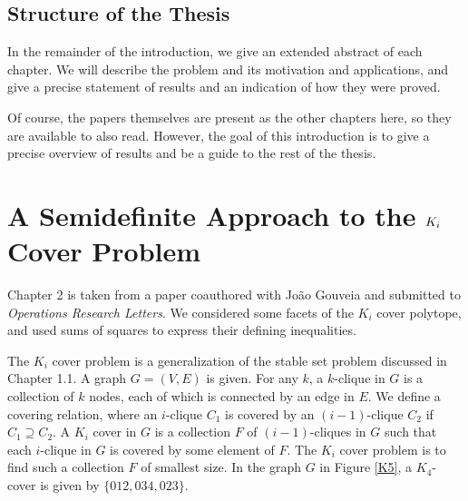 \subsection{Structure of the Thesis}
In the remainder of the introduction, we give an extended abstract of each
chapter. We will describe the problem and its motivation and applications,
and give a precise statement of results and an indication of how they were 
proved.

Of course, the papers themselves are present as the other chapters here, so
they are available to also read. However, the goal of this introduction
is to give a precise overview of results and be a guide to the rest of the
thesis.

\section{A Semidefinite Approach to the $K_\MakeLowercase{i}$ Cover Problem}
Chapter 2 is taken from a paper coauthored with Jo\~ao Gouveia and submitted to 
\emph{Operations Research Letters}. We considered some facets of the 
$K_i$ cover polytope, and used sums of squares to express their defining 
inequalities.

The $K_i$ cover problem is a generalization of the stable set problem discussed
in Chapter 1.1. A graph $G = (V,E)$ is given. For any $k$, a $k$-clique in $G$
is a collection of $k$ nodes, each of which is connected by an edge in $E$.
We define a covering relation, where an $i$-clique $C_1$ is covered by an 
$(i-1)$-clique $C_2$ if $C_1 \supseteq C_2$. A $K_i$ cover in $G$ is a
collection $F$ of $(i-1)$-cliques in $G$ such that each $i$-clique in $G$
is covered by some element of $F$. The $K_i$ cover problem is to find such a
collection $F$ of smallest size.
In the graph $G$ in Figure \ref{K5}, a $K_4$-cover is given by $\{012,034,023\}$.

